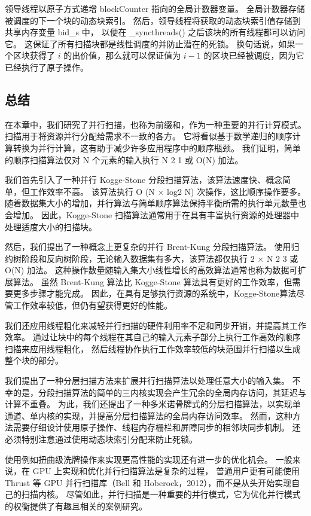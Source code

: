 领导线程以原子方式递增 blockCounter 指向的全局计数器变量。 全局计数器存储被调度的下一个块的动态块索引。 
然后，领导线程将获取的动态块索引值存储到共享内存变量 bid\_s 中，
以便在 \_syncthreads() 之后该块的所有线程都可以访问它。 这保证了所有扫描块都是线性调度的并防止潜在的死锁。 
换句话说，如果一个区块获得了 $i$ 的出价值，那么就可以保证值为 $i-1$ 的区块已经被调度，因为它已经执行了原子操作。

\subsection{总结}
在本章中，我们研究了并行扫描，也称为前缀和，作为一种重要的并行计算模式。 扫描用于将资源并行分配给需求不一致的各方。 
它将看似基于数学递归的顺序计算转换为并行计算，这有助于减少许多应用程序中的顺序瓶颈。 
我们证明，简单的顺序扫描算法仅对 N 个元素的输入执行 N 2 1 或 O(N) 加法。

我们首先引入了一种并行 Kogge-Stone 分段扫描算法，该算法速度快、概念简单，但工作效率不高。 
该算法执行 O (N × log2 N) 次操作，这比顺序操作要多。 
随着数据集大小的增加，并行算法与简单顺序算法保持平衡所需的执行单元数量也会增加。 
因此，Kogge-Stone 扫描算法通常用于在具有丰富执行资源的处理器中处理适度大小的扫描块。

然后，我们提出了一种概念上更复杂的并行 Brent-Kung 分段扫描算法。 
使用归约树阶段和反向树阶段，无论输入数据集有多大，该算法都仅执行 2 × N 2 3 或 O(N) 加法。 
这种操作数量随输入集大小线性增长的高效算法通常也称为数据可扩展算法。 
虽然 Brent-Kung 算法比 Kogge-Stone 算法具有更好的工作效率，但需要更多步骤才能完成。 
因此，在具有足够执行资源的系统中，Kogge-Stone算法尽管工作效率较低，但仍有望获得更好的性能。

我们还应用线程粗化来减轻并行扫描的硬件利用率不足和同步开销，并提高其工作效率。 
通过让块中的每个线程在其自己的输入元素子部分上执行工作高效的顺序扫描来应用线程粗化，
然后线程协作执行工作效率较低的块范围并行扫描以生成整个块的部分。

我们提出了一种分层扫描方法来扩展并行扫描算法以处理任意大小的输入集。 
不幸的是，分段扫描算法的简单的三内核实现会产生冗余的全局内存访问，其延迟与计算不重叠。 
为此，我们还提出了一种多米诺骨牌式的分层扫描算法，以实现单通道、单内核的实现，并提高分层扫描算法的全局内存访问效率。 
然而，这种方法需要仔细设计使用原子操作、线程内存栅栏和屏障同步的相邻块同步机制。 
还必须特别注意通过使用动态块索引分配来防止死锁。

使用例如扭曲级洗牌操作来实现更高性能的实现还有进一步的优化机会。 
一般来说，在 GPU 上实现和优化并行扫描算法是复杂的过程，
普通用户更有可能使用 Thrust 等 GPU 并行扫描库（Bell 和 Hoberock，2012），而不是从头开始实现自己的扫描内核。 
尽管如此，并行扫描是一种重要的并行模式，它为优化并行模式的权衡提供了有趣且相关的案例研究。